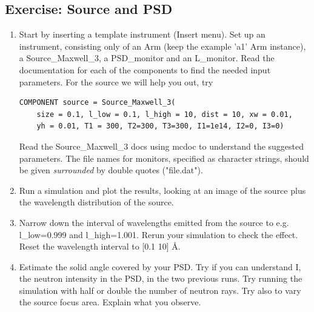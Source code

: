 \subsection{Exercise: Source and PSD}
\begin{enumerate}
\item{Start by inserting a template instrument (Insert menu). Set up an instrument, consisting only of an Arm (keep the example 'a1' Arm instance), a Source\_Maxwell\_3,
a PSD\_monitor and an L\_monitor. Read the documentation for each of
the components to find the needed input parameters. For the source we
will help you out, try
\begin{verbatim}
COMPONENT source = Source_Maxwell_3(
    size = 0.1, l_low = 0.1, l_high = 10, dist = 10, xw = 0.01,
    yh = 0.01, T1 = 300, T2=300, T3=300, I1=1e14, I2=0, I3=0)
\end{verbatim}
Read the Source\_Maxwell\_3 docs using mcdoc to understand the
suggested parameters. The file names for monitors, specified as character strings, should be given \emph{surrounded} by double quotes ("file.dat").}
\item{Run a simulation and plot the results, looking
at an image of the source plus the wavelength distribution of the
source. }
\item{Narrow down the interval of wavelengths emitted from the
source to e.g. l\_low=0.999 and l\_high=1.001. Rerun your simulation to
check the effect. Reset the wavelength interval to [0.1 10] \AA.}
\item{Estimate the solid angle covered by your PSD. Try if you can
  understand I, the neutron intensity in the PSD, in the two previous
  runs. Try running the simulation with half or double the number of
  neutron rays. Try also to vary the source focus area. Explain what you observe.}
\end{enumerate}
